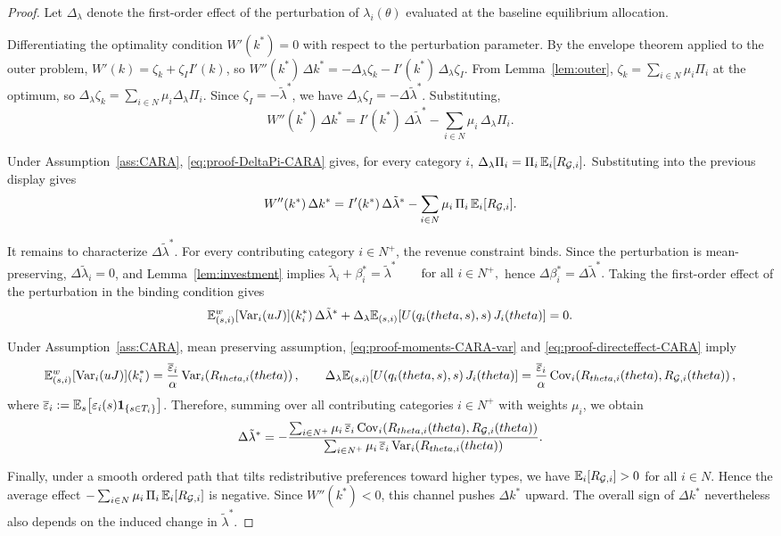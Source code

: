 \documentclass{class}
\begin{document}
\begin{proof}
Let \(\Delta_\lambda\) denote the first-order effect of the perturbation of \(\lambda_i(\theta)\) evaluated at the baseline equilibrium allocation.

Differentiating the optimality condition $W'(k^\ast)=0$ with respect to the perturbation parameter. By the envelope theorem applied to the outer problem, $W'(k)=\zeta_k+\zeta_I I'(k)$, so
$W''(k^\ast)\,\Delta k^\ast = -\Delta_\lambda\zeta_k - I'(k^\ast)\,\Delta_\lambda\zeta_I.$
From Lemma~\ref{lem:outer}, $\zeta_k=\sum_{i\in N}\mu_i\Pi_i$ at the optimum, so $\Delta_\lambda\zeta_k=\sum_{i\in N}\mu_i\Delta_\lambda\Pi_i$. Since $\zeta_I=-\tilde\lambda^\ast$, we have $\Delta_\lambda\zeta_I=-\Delta\tilde\lambda^\ast$. Substituting,
\[
W''(k^\ast)\,\Delta k^\ast = I'(k^\ast)\,\Delta\tilde\lambda^\ast - \sum_{i\in N}\mu_i\,\Delta_\lambda\Pi_i.
\]

Under Assumption~\ref{ass:CARA}, \ref{eq:proof-DeltaPi-CARA} gives, for every category \(i\),
$\Delta_\lambda \Pi_i = \Pi_i\,\mathbb{E}_i[R_{\mathcal{G},i}].$
Substituting into the previous display gives
\[
W''(k^\ast)\,\Delta k^\ast = I'(k^\ast)\,\Delta\tilde\lambda^\ast - \sum_{i\in N}\mu_i\,\Pi_i\,\mathbb{E}_i[R_{\mathcal{G},i}].
\]

It remains to characterize \(\Delta\tilde\lambda^\ast\). For every contributing category \(i\in N^+\), the revenue constraint binds. Since the perturbation is mean-preserving, \(\Delta\tilde\lambda_i=0\), and Lemma~\ref{lem:investment} implies
$\tilde\lambda_i+\beta_i^\ast=\tilde\lambda^\ast \qquad\text{for all }i\in N^+,$
hence
$\Delta\beta_i^\ast=\Delta\tilde\lambda^\ast.$
Taking the first-order effect of the perturbation in the binding condition gives
\[
\mathbb{E}_{(s,i)}^w[\mathrm{Var}_i(uJ)](k_i^\ast)\,\Delta\tilde\lambda^\ast + \Delta_\lambda\mathbb{E}_{(s,i)}\!\left[U(q_i(theta,s),s)\,J_i(theta)\right] = 0.
\]

Under Assumption~\ref{ass:CARA}, mean preserving assumption, \ref{eq:proof-moments-CARA-var} and \ref{eq:proof-directeffect-CARA} imply 
\[
\mathbb{E}_{(s,i)}^w[\mathrm{Var}_i(uJ)](k_i^\ast) = \frac{\overline\varepsilon_i}{\alpha}\,\mathrm{Var}_{i}\!\left(R_{theta,i}(theta)\right), \qquad \Delta_\lambda\mathbb{E}_{(s,i)}\!\left[U(q_i(theta,s),s)\,J_i(theta)\right] = \frac{\overline\varepsilon_i}{\alpha}\,\mathrm{Cov}_{i}\!\left(R_{theta,i}(theta),R_{\mathcal{G},i}(theta)\right),
\]
where $\overline\varepsilon_i := \mathbb{E}_s\!\left[\varepsilon_i(s)\mathbf 1_{\{s\in T_i\}}\right]$. Therefore, summing over all contributing categories \(i\in N^+\) with weights \(\mu_i\), we obtain
\[
\Delta\tilde\lambda^\ast = -\frac{\sum_{i\in N^+}\mu_i\,\overline\varepsilon_i\,\mathrm{Cov}_{i}\!\left(R_{theta,i}(theta),R_{\mathcal{G},i}(theta)\right)}{\sum_{i\in N^+}\mu_i\,\overline\varepsilon_i\,\mathrm{Var}_{i}\!\left(R_{theta,i}(theta)\right)}.
\]

Finally, under a smooth ordered path that tilts redistributive preferences toward higher types, we have $\mathbb{E}_i[R_{\mathcal{G},i}]>0$ for all $i\in N$. Hence the average effect $-\sum_{i\in N}\mu_i\,\Pi_i\,\mathbb{E}_i[R_{\mathcal{G},i}]$ is negative. Since \(W''(k^\ast)<0\), this channel pushes \(\Delta k^\ast\) upward. The overall sign of \(\Delta k^\ast\) nevertheless also depends on the induced change in \(\tilde\lambda^\ast\).
\end{proof}
\end{document}
